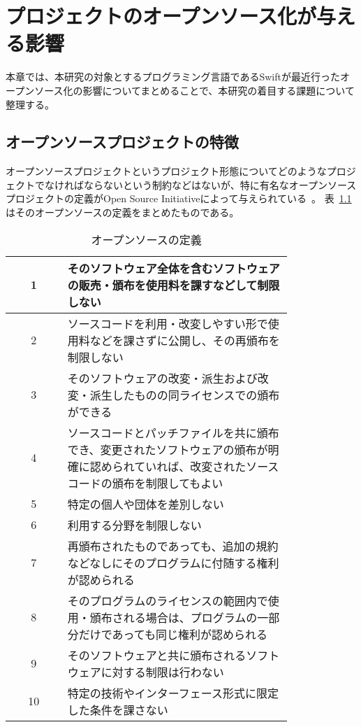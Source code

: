 \chapter{プロジェクトのオープンソース化が与える影響}
\label{open-source}

本章では、本研究の対象とするプログラミング言語であるSwiftが最近行ったオープンソース化の影響についてまとめることで、本研究の着目する課題について整理する。

\section{オープンソースプロジェクトの特徴}
\label{open-source:feature}

オープンソースプロジェクトというプロジェクト形態についてどのようなプロジェクトでなければならないという制約などはないが、特に有名なオープンソースプロジェクトの定義がOpen Source Initiativeによって与えられている~\cite{opensource}。
表~\ref{table:open-source-definition}はそのオープンソースの定義をまとめたものである。

\begin{table}[!hbtp]
    \begin{center}
        \caption{オープンソースの定義}
        \begin{tabular}{|c|p{0.8\linewidth}|}
            \hline
            1 & そのソフトウェア全体を含むソフトウェアの販売・頒布を使用料を課すなどして制限しない \\
            \hline
            2 & ソースコードを利用・改変しやすい形で使用料などを課さずに公開し、その再頒布を制限しない \\
            \hline
            3 & そのソフトウェアの改変・派生および改変・派生したものの同ライセンスでの頒布ができる \\
            \hline
            4 & ソースコードとパッチファイルを共に頒布でき、変更されたソフトウェアの頒布が明確に認められていれば、改変されたソースコードの頒布を制限してもよい \\
            \hline
            5 & 特定の個人や団体を差別しない \\
            \hline
            6 & 利用する分野を制限しない \\
            \hline
            7 & 再頒布されたものであっても、追加の規約などなしにそのプログラムに付随する権利が認められる \\
            \hline
            8 & そのプログラムのライセンスの範囲内で使用・頒布される場合は、プログラムの一部分だけであっても同じ権利が認められる \\
            \hline
            9 & そのソフトウェアと共に頒布されるソフトウェアに対する制限は行わない \\
            \hline
            10 & 特定の技術やインターフェース形式に限定した条件を課さない \\
            \hline
        \end{tabular}
        \label{table:open-source-definition}
    \end{center}
\end{table}

